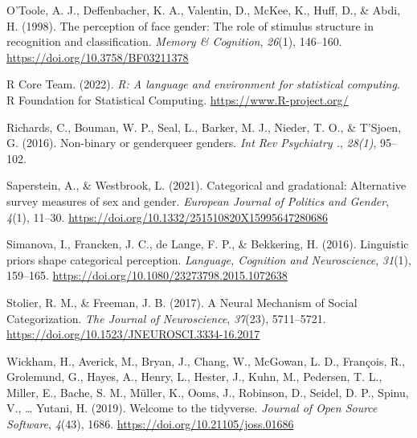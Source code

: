 \documentclass[
  man,
  longtable,
  nolmodern,
  notxfonts,
  notimes,
  colorlinks=true,linkcolor=blue,citecolor=blue,urlcolor=blue]{apa7}
\newlength{\cslhangindent}
\newenvironment{CSLReferences}[2] %
 {\begin{list}{}{%
  \setlength{\itemindent}{0pt}
  \setlength{\leftmargin}{0pt}
  \setlength{\parsep}{0pt}
  \ifodd #1
   \setlength{\leftmargin}{\cslhangindent}
   \setlength{\itemindent}{-1\cslhangindent}
  \fi
  \setlength{\itemsep}{#2\baselineskip}}}
 {\end{list}}
\begin{document}
\begin{CSLReferences}{1}{0}
O'Toole, A. J., Deffenbacher, K. A., Valentin, D., McKee, K., Huff, D.,
\& Abdi, H. (1998). The perception of face gender: {The} role of
stimulus structure in recognition and classification. \emph{Memory \&
Cognition}, \emph{26}(1), 146--160.
\url{https://doi.org/10.3758/BF03211378}

R Core Team. (2022). \emph{R: A language and environment for statistical
computing}. R Foundation for Statistical Computing.
\url{https://www.R-project.org/}

Richards, C., Bouman, W. P., Seal, L., Barker, M. J., Nieder, T. O., \&
T'Sjoen, G. (2016). Non-binary or genderqueer genders. \emph{Int Rev
Psychiatry .}, \emph{28(1)}, 95--102.

Saperstein, A., \& Westbrook, L. (2021). Categorical and gradational:
Alternative survey measures of sex and gender. \emph{European Journal of
Politics and Gender}, \emph{4}(1), 11--30.
\url{https://doi.org/10.1332/251510820X15995647280686}

Simanova, I., Francken, J. C., de Lange, F. P., \& Bekkering, H. (2016).
Linguistic priors shape categorical perception. \emph{Language,
Cognition and Neuroscience}, \emph{31}(1), 159--165.
\url{https://doi.org/10.1080/23273798.2015.1072638}

Stolier, R. M., \& Freeman, J. B. (2017). A {Neural Mechanism} of
{Social Categorization}. \emph{The Journal of Neuroscience},
\emph{37}(23), 5711--5721.
\url{https://doi.org/10.1523/JNEUROSCI.3334-16.2017}

Wickham, H., Averick, M., Bryan, J., Chang, W., McGowan, L. D.,
François, R., Grolemund, G., Hayes, A., Henry, L., Hester, J., Kuhn, M.,
Pedersen, T. L., Miller, E., Bache, S. M., Müller, K., Ooms, J.,
Robinson, D., Seidel, D. P., Spinu, V., \ldots{} Yutani, H. (2019).
Welcome to the {tidyverse}. \emph{Journal of Open Source Software},
\emph{4}(43), 1686. \url{https://doi.org/10.21105/joss.01686}

\end{CSLReferences}
\end{document}
